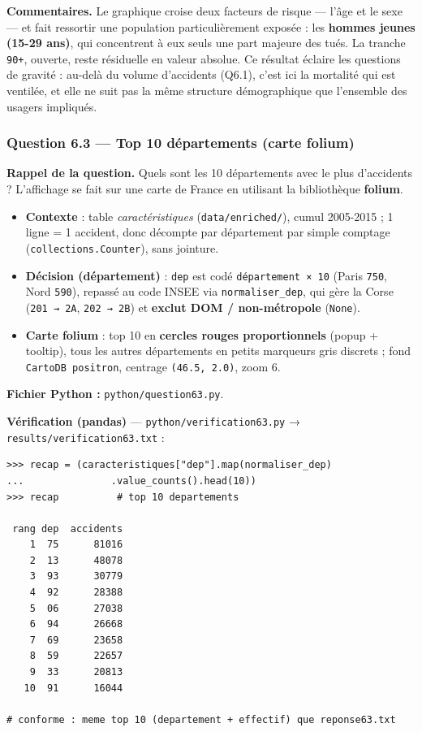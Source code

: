 \documentclass[11pt,a4paper]{article}
\newcommand{\rub}[2]{\textbf{\textcolor{#1}{#2}}}
\begin{document}
\rub{labcomment}{Commentaires.} Le graphique croise deux facteurs de risque — l'âge et le sexe — et fait ressortir une population particulièrement exposée : les \textbf{hommes jeunes (15-29 ans)}, qui concentrent à eux seuls une part majeure des tués. La tranche \texttt{90+}, ouverte, reste résiduelle en valeur absolue. Ce résultat éclaire les questions de gravité : au-delà du volume d'accidents (Q6.1), c'est ici la mortalité qui est ventilée, et elle ne suit pas la même structure démographique que l'ensemble des usagers impliqués.

\clearpage
\subsubsection*{Question 6.3 — Top 10 départements (carte folium)}

\rub{labrappel}{Rappel de la question.} Quels sont les 10 départements avec le plus d'accidents ? L'affichage se fait sur une carte de France en utilisant la bibliothèque \textbf{folium}.

\begin{agentbox}
\begin{itemize}
\item \textbf{Contexte} : table \emph{caractéristiques} (\texttt{data/enriched/}), cumul 2005-2015 ; 1 ligne = 1 accident, donc décompte par département par simple comptage (\texttt{collections.Counter}), sans jointure.
\item \textbf{Décision (département)} : \texttt{dep} est codé \texttt{département × 10} (Paris \texttt{750}, Nord \texttt{590}), repassé au code INSEE via \texttt{normaliser\_dep}, qui gère la Corse (\texttt{201 → 2A}, \texttt{202 → 2B}) et \textbf{exclut DOM / non-métropole} (\texttt{None}).
\item \textbf{Carte folium} : top 10 en \textbf{cercles rouges proportionnels} (popup + tooltip), tous les autres départements en petits marqueurs gris discrets ; fond \texttt{CartoDB positron}, centrage \texttt{(46.5, 2.0)}, zoom 6.
\end{itemize}
\end{agentbox}

\rub{labfichier}{Fichier Python :} \texttt{python/question63.py}.

\rub{labverif}{Vérification (pandas)} --- \texttt{python/verification63.py} → \texttt{results/verification63.txt} :

\begin{lstlisting}[style=pyblock]
>>> recap = (caracteristiques["dep"].map(normaliser_dep)
...               .value_counts().head(10))
>>> recap          # top 10 departements

 rang dep  accidents
    1  75      81016
    2  13      48078
    3  93      30779
    4  92      28388
    5  06      27038
    6  94      26668
    7  69      23658
    8  59      22657
    9  33      20813
   10  91      16044

# conforme : meme top 10 (departement + effectif) que reponse63.txt
\end{lstlisting}
\end{document}

